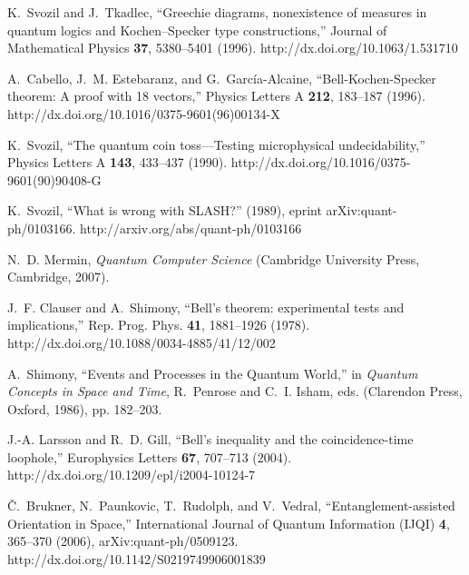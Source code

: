 \documentclass[pra,amsfonts,showpacs,showkeys,preprint]{revtex4}
\begin{document}
\begin{thebibliography}{10}
K.~Svozil and J.~Tkadlec, \enquote{Greechie diagrams, nonexistence of measures
  in quantum logics and {K}ochen--{S}pecker type constructions,} Journal of
  Mathematical Physics {\bf 37}, 5380--5401 (1996).
\newline http://dx.doi.org/10.1063/1.531710

A.~Cabello, J.~M. Estebaranz, and G.~Garc{\'{i}}a-Alcaine,
  \enquote{{B}ell-{K}ochen-{S}pecker theorem: A proof with 18 vectors,} Physics
  Letters A {\bf 212}, 183--187 (1996).
\newline http://dx.doi.org/10.1016/0375-9601(96)00134-X

K.~Svozil, \enquote{The quantum coin toss---Testing microphysical
  undecidability,} Physics Letters A {\bf 143}, 433--437 (1990).
\newline http://dx.doi.org/10.1016/0375-9601(90)90408-G

K.~Svozil, \enquote{What is wrong with {SLASH}?}  (1989), eprint
  arXiv:quant-ph/0103166.
\newline http://arxiv.org/abs/quant-ph/0103166

N.~D. Mermin, {\em Quantum Computer Science\/} (Cambridge University Press,
  Cambridge, 2007).

J.~F. Clauser and A.~Shimony, \enquote{{B}ell's theorem: experimental tests and
  implications,} Rep. Prog. Phys. {\bf 41}, 1881--1926 (1978).
\newline http://dx.doi.org/10.1088/0034-4885/41/12/002

A.~Shimony, \enquote{Events and Processes in the Quantum World,} in {\em
  Quantum Concepts in Space and Time\/}, R.~Penrose and C.~I. Isham, eds.
  (Clarendon Press, Oxford, 1986), pp. 182--203.

J.-A. Larsson and R.~D. Gill, \enquote{Bell's inequality and the
  coincidence-time loophole,} Europhysics Letters {\bf 67}, 707--713 (2004).
\newline http://dx.doi.org/10.1209/epl/i2004-10124-7

{\v{C}}.~Brukner, N.~Paunkovic, T.~Rudolph, and V.~Vedral,
  \enquote{Entanglement-assisted Orientation in Space,} International Journal
  of Quantum Information (IJQI) {\bf 4}, 365--370 (2006),
  arXiv:quant-ph/0509123.
\newline http://dx.doi.org/10.1142/S0219749906001839


\end{thebibliography}
\end{document}
